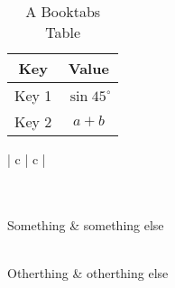 \documentclass[a4paper, 12pt]{article}
\begin{document}
\begin{table}[htbp]
    \centering
    \begin{tabular}{c c}
        \toprule
        \textbf{Key} & \textbf{Value} \\
        \midrule
        Key 1 & $\sin 45^{\circ}$ \\ 
        Key 2 & $a + b$ \\ 
        \bottomrule
    \end{tabular}
    \caption{A Booktabs Table}
    \label{tab:bttable}
\end{table}

\begin{longtable}[c]{| c | c |}
    \caption{Long table caption.\label{long}}\\
    
    \hline
    \\
    \hline
    Something & something else\\
    \hline
    \endfirsthead
    
    \hline
    \\
    \hline
    Otherthing & otherthing else\\
    \hline
    \endhead

    \hline
    \\
    \hline
    \endfoot
    
    \hline
    \\
    \hline\hline
    \endlastfoot
    

\end{longtable}
\end{document}
